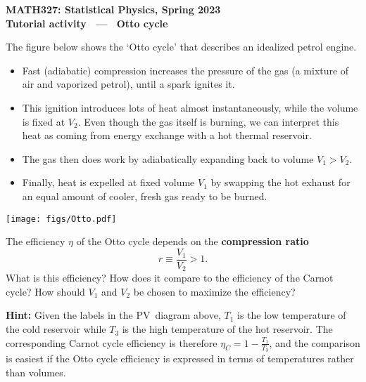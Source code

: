 \documentclass[12 pt]{article} %
\begin{document}
\newcommand{\thisunit}{MATH327 Tutorial (Cycle)}
\newcommand{\moddate}{Last modified 15 Mar.~2023}
\begin{center}
  {\Large \textbf{MATH327: Statistical Physics, Spring 2023}} \\[12 pt]
  {\Large \textbf{Tutorial activity \ --- \ Otto cycle}} \\[24 pt]
\end{center}

The figure below shows the `Otto cycle' that describes an idealized petrol engine. \\[-24 pt]
\begin{itemize}
  \item Fast (adiabatic) compression increases the pressure of the gas (a mixture of air and vaporized petrol), until a spark ignites it.
  \item This ignition introduces lots of heat almost instantaneously, while the volume is fixed at $V_2$.
        Even though the gas itself is burning, we can interpret this heat as coming from energy exchange with a hot thermal reservoir.
  \item The gas then does work by adiabatically expanding back to volume $V_1 > V_2$.
  \item Finally, heat is expelled at fixed volume $V_1$ by swapping the hot exhaust for an equal amount of cooler, fresh gas ready to be burned.
\end{itemize}

\begin{center}\texttt{[image: figs/Otto.pdf]}\end{center}

The efficiency $\eta$ of the Otto cycle depends on the \textbf{compression ratio}
\begin{equation*}
  r \equiv \frac{V_1}{V_2} > 1.
\end{equation*}
What is this efficiency?
How does it compare to the efficiency of the Carnot cycle?
How should $V_1$ and $V_2$ be chosen to maximize the efficiency?

\textbf{Hint:} Given the labels in the PV~diagram above, $T_1$ is the low temperature of the cold reservoir while $T_3$ is the high temperature of the hot reservoir.
The corresponding Carnot cycle efficiency is therefore $\eta_C = 1 - \frac{T_1}{T_3}$, and the comparison is easiest if the Otto cycle efficiency is expressed in terms of temperatures rather than volumes.
\end{document}
